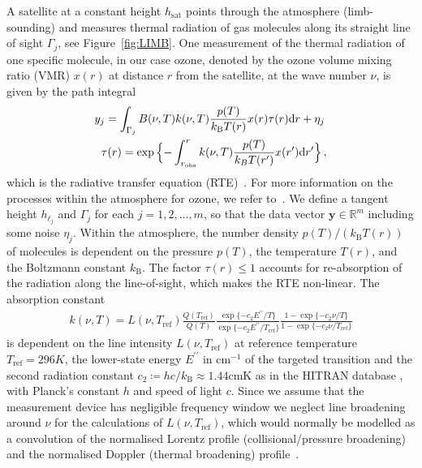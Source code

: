 A satellite at a constant height $h_{\text{sat}}$ points through the atmosphere (limb-sounding) and measures thermal radiation of gas molecules along its straight line of sight $\Gamma_j$, see  Figure~\ref{fig:LIMB}.
One measurement of the thermal radiation of one specific molecule, in our case ozone, denoted by the ozone volume mixing ratio (VMR) $x(r)$ at distance $r$ from the satellite, at the wave number $\nu$, is given by the path integral
\begin{align}
	\label{eq:RTE} 
	y_j =   \int_{\Gamma_j}  B(\nu,T) k(\nu, T)   \frac{p(T)}{k_{\text{B}} T(r)}  x(r)  \tau(r) \text{d}r + \eta_j \, \\
	\tau(r) = \exp{ \Bigl\{ - \int^{r}_{r_\text{obs}}  k(\nu, T)   \frac{p(T)}{k_B T(r^{\prime})}  x(r^{\prime}) \text{d}r^{\prime} \Bigr\} } \, ,\label{eq:absRTE} 
\end{align}
which is the radiative transfer equation (RTE)~\cite{mipas2000handbook}.
For more information on the processes within the atmosphere for ozone, we refer to~\cite{Lee2020NightOzone}.
We define a tangent height $h_{\ell_j}$ and $\Gamma_j$ for each $j=1,2,\ldots,m$, so that the data vector $\bm{y} \in \mathbb{R}^m$ including some noise $\eta_j$.
Within the atmosphere, the number density $p(T) / (k_{\text{B}} T(r))$ of molecules is dependent on the pressure $p(T)$, the temperature $T(r)$, and the Boltzmann constant $k_{\text{B}}$.
The factor $\tau(r)\leq 1$ accounts for re-absorption of the radiation along the line-of-sight, which makes the RTE non-linear.
The absorption constant
\begin{align}
	k(\nu, T) = L(\nu, T_{\text{ref}}) \frac{Q(T_{\text{ref}})}{Q(T)} \frac{ \exp{\{ - c_2 E^{\prime \prime} / T\}} }{\exp{\{ - c_2 E^{\prime \prime} / T_{\text{ref}} \}}} \frac{ 1- \exp{\{ - c_2 \nu  / T \}} }{1 - \exp{\{ - c_2 \nu / T_{\text{ref}} \}}}
\end{align}
is dependent on the line intensity $L(\nu, T_{\text{ref}})$ at reference temperature $T_{\text{ref}} =296K $, the lower-state energy $ E^{\prime \prime} $ in $\text{cm}^{-1}$ of the targeted transition and the second radiation constant $c_2\coloneqq hc/k_{\text{B}} \approx 1.44\text{cmK}$ as in the HITRAN database \cite{gordon2022hitran2020}, with Planck's constant $h$ and speed of light $c$.
Since we assume that the measurement device has negligible frequency window we neglect line broadening around $\nu$ for the calculations of $L(\nu, T_{\text{ref}})$, which would normally be modelled as a convolution of the normalised Lorentz profile (collisional/pressure broadening) and the normalised Doppler (thermal broadening) profile~\cite{mipas2000handbook}.
